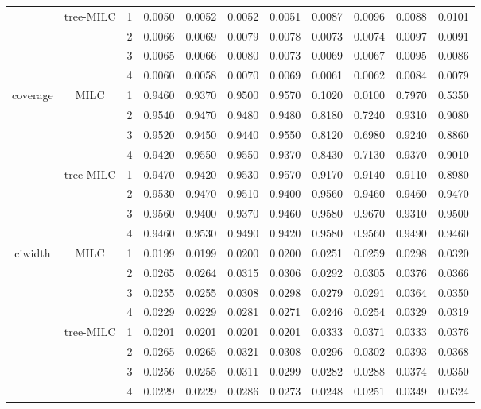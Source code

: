 \documentclass[a4paper, 11pt]{article} %
\begin{document}
\begin{table}[h]
\begin{tabular}{cc
r cccccccc}
     \cline{2-11}
   &\multirow{4}{*}{tree-MILC}
  &1 & 0.0050 & 0.0052 & 0.0052 & 0.0051 & 0.0087 & 0.0096 & 0.0088 & 0.0101 \\ 
  &&2 & 0.0066 & 0.0069 & 0.0079 & 0.0078 & 0.0073 & 0.0074 & 0.0097 & 0.0091 \\ 
  &&3 & 0.0065 & 0.0066 & 0.0080 & 0.0073 & 0.0069 & 0.0067 & 0.0095 & 0.0086 \\ 
  &&4 & 0.0060 & 0.0058 & 0.0070 & 0.0069 & 0.0061 & 0.0062 & 0.0084 & 0.0079 \\ 
    \hline
    \hline
  \multirow{8}{*}{coverage} %
   & \multirow{4}{*}{MILC} 
  &1 & 0.9460 & 0.9370 & 0.9500 & 0.9570 & 0.1020 & 0.0100 & 0.7970 & 0.5350 \\ 
  &&2 & 0.9540 & 0.9470 & 0.9480 & 0.9480 & 0.8180 & 0.7240 & 0.9310 & 0.9080 \\ 
  &&3 & 0.9520 & 0.9450 & 0.9440 & 0.9550 & 0.8120 & 0.6980 & 0.9240 & 0.8860 \\ 
  &&4 & 0.9420 & 0.9550 & 0.9550 & 0.9370 & 0.8430 & 0.7130 & 0.9370 & 0.9010 \\ 

  \cline{2-11}
   &\multirow{4}{*}{tree-MILC}
  &1 & 0.9470 & 0.9420 & 0.9530 & 0.9570 & 0.9170 & 0.9140 & 0.9110 & 0.8980 \\ 
  &&2 & 0.9530 & 0.9470 & 0.9510 & 0.9400 & 0.9560 & 0.9460 & 0.9460 & 0.9470 \\ 
  &&3 & 0.9560 & 0.9400 & 0.9370 & 0.9460 & 0.9580 & 0.9670 & 0.9310 & 0.9500 \\ 
  &&4 & 0.9460 & 0.9530 & 0.9490 & 0.9420 & 0.9580 & 0.9560 & 0.9490 & 0.9460 \\     
  \hline
    \hline
    \multirow{8}{*}{ciwidth}
   & \multirow{4}{*}{MILC}
 & 1 & 0.0199 & 0.0199 & 0.0200 & 0.0200 & 0.0251 & 0.0259 & 0.0298 & 0.0320 \\ 
 && 2 & 0.0265 & 0.0264 & 0.0315 & 0.0306 & 0.0292 & 0.0305 & 0.0376 & 0.0366 \\ 
 && 3 & 0.0255 & 0.0255 & 0.0308 & 0.0298 & 0.0279 & 0.0291 & 0.0364 & 0.0350 \\ 
 && 4 & 0.0229 & 0.0229 & 0.0281 & 0.0271 & 0.0246 & 0.0254 & 0.0329 & 0.0319 \\ 

 \cline{2-11}
   &\multirow{4}{*}{tree-MILC} 
  &1 & 0.0201 & 0.0201 & 0.0201 & 0.0201 & 0.0333 & 0.0371 & 0.0333 & 0.0376 \\ 
  &&2 & 0.0265 & 0.0265 & 0.0321 & 0.0308 & 0.0296 & 0.0302 & 0.0393 & 0.0368 \\ 
   &&3 &0.0256 & 0.0255 & 0.0311 & 0.0299 & 0.0282 & 0.0288 & 0.0374 & 0.0350 \\ 
  &&4 & 0.0229 & 0.0229 & 0.0286 & 0.0273 & 0.0248 & 0.0251 & 0.0349 & 0.0324 \\ 
  \hline
\end{tabular}
\label{Table_prop_combi}
\end{table}
\end{document}
